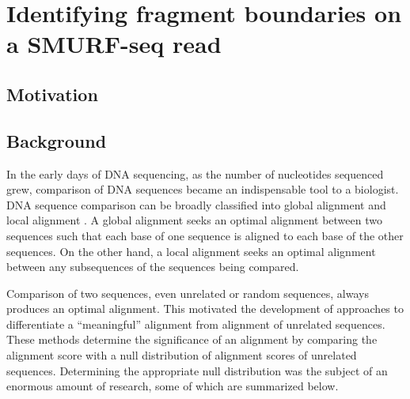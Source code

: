 
\chapter{Identifying fragment boundaries on a SMURF-seq read}
\label{ch4}

\section{Motivation}


\section{Background}
In the early days of DNA sequencing, as the number of nucleotides
sequenced grew, comparison of DNA sequences became an indispensable tool
to a biologist.
%
DNA sequence comparison can be broadly classified into global alignment
\cite{needleman1970general} and local alignment
\cite{smith1981identification}. A global alignment seeks an optimal
alignment between two sequences such that each base of one sequence is
aligned to each base of the other sequences. On the other hand, a local
alignment seeks an optimal alignment between any subsequences of the
sequences being compared.

Comparison of two sequences, even unrelated or random sequences, always
produces an optimal alignment. This motivated the development of
approaches to differentiate a ``meaningful'' alignment from alignment of
unrelated sequences. These methods determine the significance of an
alignment by comparing the alignment score with a null distribution of
alignment scores of unrelated sequences. Determining the appropriate null
distribution was the subject of an enormous amount of research, some of
which are summarized below.

